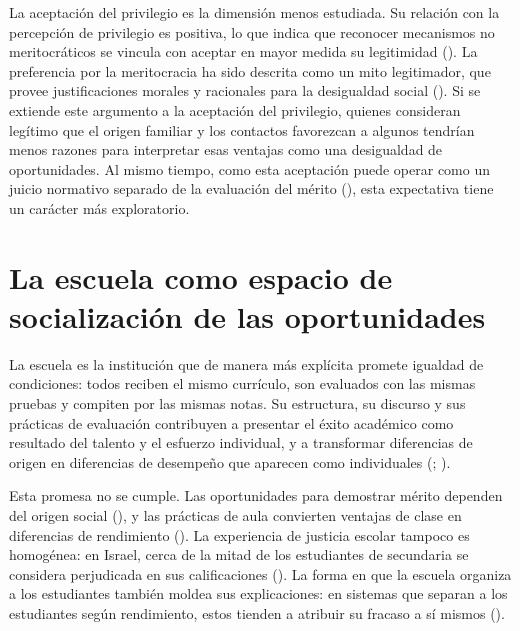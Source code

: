 \documentclass[
  spanish,
  a4paper,
  oneside]{scrbook}
\begin{document}
La aceptación del privilegio es la dimensión menos estudiada. Su
relación con la percepción de privilegio es positiva, lo que indica que
reconocer mecanismos no meritocráticos se vincula con aceptar en mayor
medida su legitimidad (). La preferencia por la meritocracia ha sido descrita como un mito
legitimador, que provee justificaciones morales y racionales para la
desigualdad social (). Si se extiende este argumento a la aceptación del
privilegio, quienes consideran legítimo que el origen familiar y los
contactos favorezcan a algunos tendrían menos razones para interpretar
esas ventajas como una desigualdad de oportunidades. Al mismo tiempo,
como esta aceptación puede operar como un juicio normativo separado de
la evaluación del mérito (), esta expectativa tiene un carácter más exploratorio.

\section{La escuela como espacio de socialización de las
oportunidades}\label{la-escuela-como-espacio-de-socializaciuxf3n-de-las-oportunidades}

La escuela es la institución que de manera más explícita promete
igualdad de condiciones: todos reciben el mismo currículo, son evaluados
con las mismas pruebas y compiten por las mismas notas. Su estructura,
su discurso y sus prácticas de evaluación contribuyen a presentar el
éxito académico como resultado del talento y el esfuerzo individual, y a
transformar diferencias de origen en diferencias de desempeño que
aparecen como individuales
(;
).

Esta promesa no se cumple. Las oportunidades para demostrar mérito
dependen del origen social (), y las
prácticas de aula convierten ventajas de clase en diferencias de
rendimiento (). La experiencia de justicia escolar tampoco es homogénea: en
Israel, cerca de la mitad de los estudiantes de secundaria se considera
perjudicada en sus calificaciones (). La forma en que la escuela organiza a los estudiantes
también moldea sus explicaciones: en sistemas que separan a los
estudiantes según rendimiento, estos tienden a atribuir su fracaso a sí
mismos ().
\end{document}
